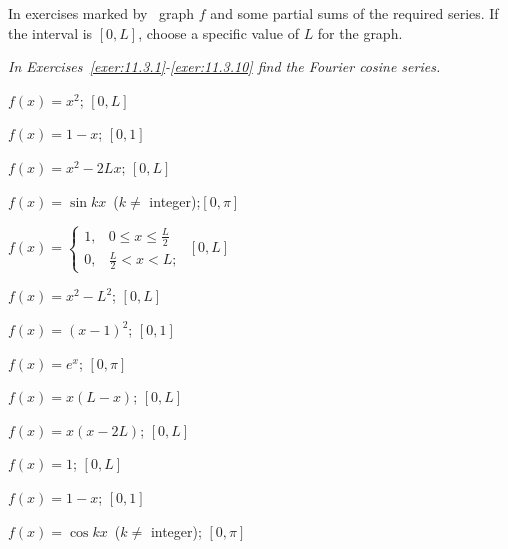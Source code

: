 \exercises
\noindent
In exercises marked by \Cex\, graph $f$ and some partial sums of the required series. If the
interval is $[0,L]$, choose a specific value of $L$ for the graph.

\noindent
\emph{In Exercises~\ref{exer:11.3.1}-\ref{exer:11.3.10} find the Fourier cosine series.}

\begin{exerciselist}
  \item\label{exer:11.3.1} $f(x)=x^{2}$; \quad $[0,L]$

  \item\label{exer:11.3.2} \Cex $f(x)=1-x$; \quad $[0,1]$

  \item\label{exer:11.3.3} \Cex $f(x)=x^{2}-2Lx$; \quad $[0,L]$

  \item\label{exer:11.3.4} $f(x)=\sin kx$\, ($k\ne$ integer);\quad $[0,\pi]$

  \item\label{exer:11.3.5} \Cex $f(x)= \left\{
  \begin{array}{cl}
    1, & 0\le x\le\frac{L}{2} \\
    0, & \frac{L}{2}<x<L;
  \end{array}\right.$ \quad $[0,L]$

  \item\label{exer:11.3.6} $f(x)=x^{2}-L^{2}$; \quad $[0,L]$

  \item\label{exer:11.3.7} $f(x)=(x-1)^{2}$; \quad $[0,1]$

  \item\label{exer:11.3.8} $f(x)=e^{x}$; \quad $[0,\pi]$

  \item\label{exer:11.3.9} \Cex $f(x)=x(L-x)$; \quad $[0,L]$

  \item\label{exer:11.3.10} \Cex $f(x)=x(x-2L)$; \quad $[0,L]$


  \item\label{exer:11.3.11} \Cex $f(x)=1$; \quad$[0,L]$

  \item\label{exer:11.3.12} \Cex $f(x)=1-x$; \quad $[0,1]$

  \item\label{exer:11.3.13} $f(x)=\cos kx$\, ($k\ne$ integer); \quad $[0,\pi]$


\end{exerciselist}
